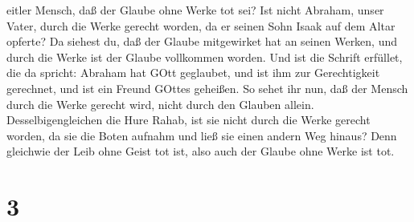 eitler Mensch, daß der Glaube ohne Werke tot sei?  Ist
nicht Abraham, unser Vater, durch die Werke gerecht worden, da er seinen
Sohn Isaak auf dem Altar opferte?  Da siehest du, daß der
Glaube mitgewirket hat an seinen Werken, und durch die Werke ist der
Glaube vollkommen worden.  Und ist die Schrift erfüllet,
die da spricht: Abraham hat GOtt geglaubet, und ist ihm zur
Gerechtigkeit gerechnet, und ist ein Freund GOttes geheißen.
 So sehet ihr nun, daß der Mensch durch die Werke gerecht
wird, nicht durch den Glauben allein.  Desselbigengleichen
die Hure Rahab, ist sie nicht durch die Werke gerecht worden, da sie die
Boten aufnahm und ließ sie einen andern Weg hinaus?  Denn
gleichwie der Leib ohne Geist tot ist, also auch der Glaube ohne Werke
ist tot.

\hypertarget{section-2}{%
\section{3}\label{section-2}}

